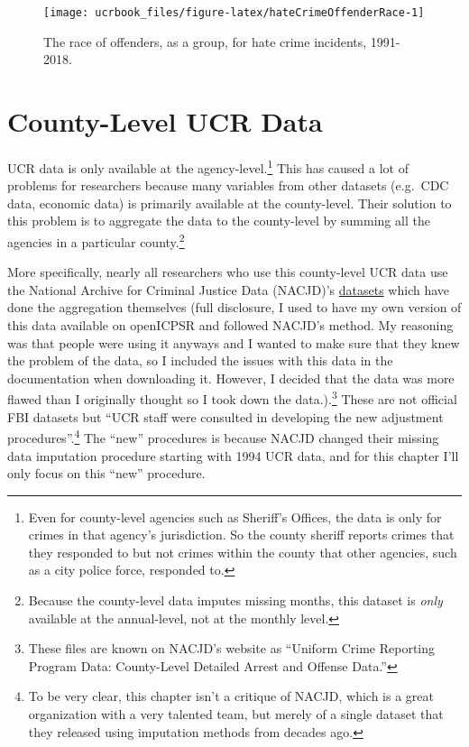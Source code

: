 \documentclass[
  12pt,
  openany]{book}
\begin{document}
\begin{figure}

{\centering \texttt{[image: ucrbook\_files/figure-latex/hateCrimeOffenderRace-1]} 

}

\caption{The race of offenders, as a group, for hate crime incidents, 1991-2018.}\label{fig:hateCrimeOffenderRace}
\end{figure}

\hypertarget{county-level-ucr-data}{%
\chapter{County-Level UCR Data}\label{county-level-ucr-data}}

UCR data is only available at the agency-level.\footnote{Even for county-level agencies such as Sheriff's Offices, the data is only for crimes in that agency's jurisdiction. So the county sheriff reports crimes that they responded to but not crimes within the county that other agencies, such as a city police force, responded to.} This has caused a lot of problems for researchers because many variables from other datasets (e.g.~CDC data, economic data) is primarily available at the county-level. Their solution to this problem is to aggregate the data to the county-level by summing all the agencies in a particular county.\footnote{Because the county-level data imputes missing months, this dataset is \emph{only} available at the annual-level, not at the monthly level.}

More specifically, nearly all researchers who use this county-level UCR data use the National Archive for Criminal Justice Data (NACJD)'s \href{https://www.icpsr.umich.edu/web/pages/NACJD/guides/ucr.html\#desc_cl}{datasets} which have done the aggregation themselves (full disclosure, I used to have my own version of this data available on openICPSR and followed NACJD's method. My reasoning was that people were using it anyways and I wanted to make sure that they knew the problem of the data, so I included the issues with this data in the documentation when downloading it. However, I decided that the data was more flawed than I originally thought so I took down the data.).\footnote{These files are known on NACJD's website as ``Uniform Crime Reporting Program Data: County-Level Detailed Arrest and Offense Data.''} These are not official FBI datasets but ``UCR staff were consulted in developing the new adjustment procedures''.\footnote{To be very clear, this chapter isn't a critique of NACJD, which is a great organization with a very talented team, but merely of a single dataset that they released using imputation methods from decades ago.} The ``new'' procedures is because NACJD changed their missing data imputation procedure starting with 1994 UCR data, and for this chapter I'll only focus on this ``new'' procedure.
\end{document}
